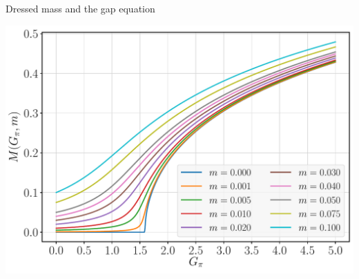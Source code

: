 \begin{frame}[allowframebreaks]{Dressed mass and the gap equation}
\break


\break

	\begin{center}
		\includegraphics[width=.5\paperwidth]{Figures/chapter02/NJL-dressed-mass-curves}
	\end{center}


\end{frame}
